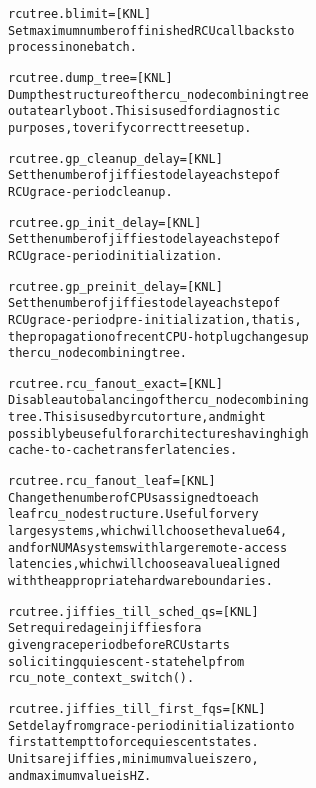 \documentclass[a4paper,8pt,english]{sphinxmanual}
\begin{document}
\begin{alltt}
        rcutree.blimit= {[}KNL{]}
                        Set maximum number of finished RCU callbacks to
                        process in one batch.

        rcutree.dump\_tree=      {[}KNL{]}
                        Dump the structure of the rcu\_node combining tree
                        out at early boot.  This is used for diagnostic
                        purposes, to verify correct tree setup.

        rcutree.gp\_cleanup\_delay=       {[}KNL{]}
                        Set the number of jiffies to delay each step of
                        RCU grace-period cleanup.

        rcutree.gp\_init\_delay=  {[}KNL{]}
                        Set the number of jiffies to delay each step of
                        RCU grace-period initialization.

        rcutree.gp\_preinit\_delay=       {[}KNL{]}
                        Set the number of jiffies to delay each step of
                        RCU grace-period pre-initialization, that is,
                        the propagation of recent CPU-hotplug changes up
                        the rcu\_node combining tree.

        rcutree.rcu\_fanout\_exact= {[}KNL{]}
                        Disable autobalancing of the rcu\_node combining
                        tree.  This is used by rcutorture, and might
                        possibly be useful for architectures having high
                        cache-to-cache transfer latencies.

        rcutree.rcu\_fanout\_leaf= {[}KNL{]}
                        Change the number of CPUs assigned to each
                        leaf rcu\_node structure.  Useful for very
                        large systems, which will choose the value 64,
                        and for NUMA systems with large remote-access
                        latencies, which will choose a value aligned
                        with the appropriate hardware boundaries.

        rcutree.jiffies\_till\_sched\_qs= {[}KNL{]}
                        Set required age in jiffies for a
                        given grace period before RCU starts
                        soliciting quiescent-state help from
                        rcu\_note\_context\_switch().

        rcutree.jiffies\_till\_first\_fqs= {[}KNL{]}
                        Set delay from grace-period initialization to
                        first attempt to force quiescent states.
                        Units are jiffies, minimum value is zero,
                        and maximum value is HZ.


\end{alltt}
\end{document}
